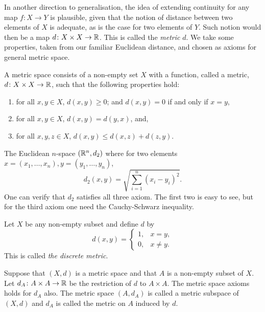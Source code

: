 \documentclass[main.tex]{subfiles}
\begin{document}
		In another direction to generalisation, the idea of extending continuity for any map $f\colon X \to Y$ is plausible, given that the notion of distance between two elements of $X$ is adequate, as is the case for two elements of $Y$. Such notion would then be a map $d\colon X \times X \to \mathbb R$. This is called the \textit{metric} $d$. We take some properties, taken from our familiar Euclidean distance, and chosen as axioms for general metric space.
		\begin{definition}
			A metric space consists of a non-empty set $X$ with a function, called a metric, $d\colon X \times X \to \mathbb R$, such that the following properties hold:
			\begin{enumerate}
				\item for all $x, y \in X$, $d(x, y) \geq 0$; and $d(x, y) = 0$ if and only if $x = y$,
				\item for all $x, y \in X$, $d(x,y) = d(y, x)$, and,
				\item for all $x, y, z\in X$, $d(x,y) \leq d(x,z) + d(z, y)$.
			\end{enumerate}
		\end{definition}
		\begin{example}
			The Euclidean $n$-space $(\mathbb R^n, d_2)$ where for two elements $x = (x_1,\ldots,x_n), y = (y_1,\ldots, y_n)$,
			\begin{equation*}
				d_2(x, y) = \sqrt{\sum_{i = 1}^n (x_i - y_i)^2}.
			\end{equation*}
			One can verify that $d_2$ satisfies all three axiom. The first two is easy to see, but for the third axiom one need the Cauchy-Schwarz inequality.
		\end{example}
		\begin{example}
			Let $X$ be any non-empty subset and define $d$ by
			\begin{equation*}d(x,y) =
			\begin{cases}
			1, & x = y, \\
			0, & x \neq y.
			\end{cases}
			\end{equation*}
			This is called \textit{the discrete metric}.
		\end{example}
		\begin{definition}
			Suppose that $(X, d)$ is a metric space and that $A$ is a non-empty subset of $X$. Let $d_A \colon A \times A \to \mathbb R$ be the restriction of $d$ to $A\times A$. The metric space axioms holds for $d_A$ also. The metric space $(A, d_A)$ is called a metric subspace of $(X, d)$ and $d_A$ is called the metric on $A$ induced by $d$.
		\end{definition}
\end{document}
